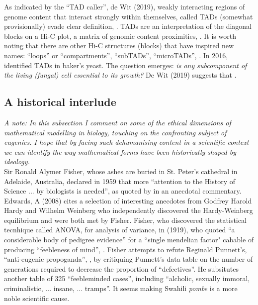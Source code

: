 As indicated by the ``TAD caller'', de Wit (2019), 
weakly interacting regions of genome content that interact strongly within themselves,
called TADs (somewhat provisionally) evade clear definition, \cite{de2020tads}.
TADs are an interpretation of the diagonal blocks on a Hi-C plot, a matrix of genomic 
content proximities, \cite{de2020tads}. It is worth noting that there are 
other Hi-C structures (blocks) that have inspired new names: ``loops'' or ``compartments'', ``subTADs'',
``microTADs'', \cite{beagan2020existence}. In 2016, \cite{eser2017form} identified TADs 
in baker's yeast. The question emerges: \textit{is any subcomponent of the living (fungal) cell essential to its
growth? } De Wit (2019) suggests that .

\subsection{A historical interlude}

\textit{A note: In this subsection I comment on 
some of the ethical dimensions of mathematical modelling in biology, 
touching on the confronting subject of eugenics. I hope that by facing 
such dehumanising content in a scientific context we 
can identify the way mathematical forms have been historically shaped by 
ideology.}
\\

Sir Ronald Alymer Fisher, whose ashes are buried in St. Peter's cathedral in Adelaide, Australia,
declared in 1959 that more ``attention to the History of Science ... by biologists is needed'',
as quoted by \cite{edwards2008gh} in an anecdotal commentary. Edwards, A (2008) cites
a selection of interesting anecdotes from Godfrey Harold Hardy and Wilhelm Weinberg who 
independently discovered the Hardy-Weinberg equilibrium and were both met by Fisher.
Fisher, who discovered the statistical tecnhique called ANOVA, for analysis of variance, in 
\cite{fisher1919xv} (1919), who quoted ``a considerable body of pedigree evidence'' for 
a ``single mendelian factor" cabable of producing ``feebleness of mind'', 
\cite{fisher1924elimination}. Fisher attempts to refute Reginald Punnett's, 
``anti-eugenic propoganda'', \cite{fisher1924elimination}, by critiquing
Punnett's data table on the number of generations required to decrease 
the proportion of ``defectives''. He subsitutes another table of 325 ``feebleminded cases'',
including ``alcholic, sexually immoral, criminalistic, ... insane, ... tramps''.
It seems making Swahili \textit{pombe} is a more noble scientific cause.
\\


